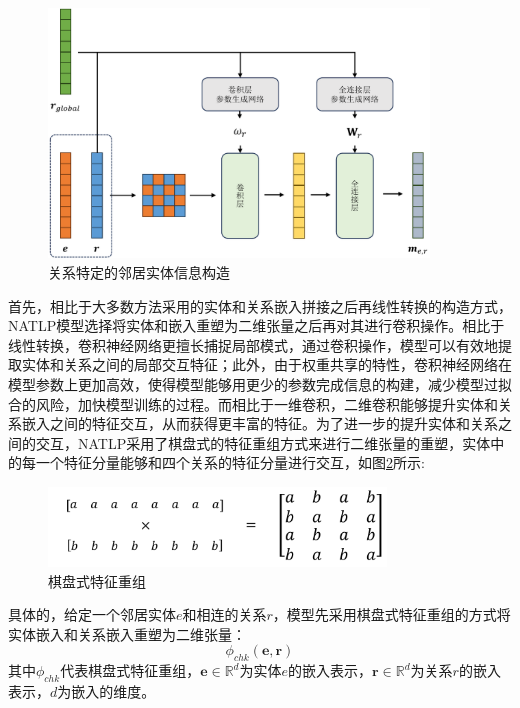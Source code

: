 \begin{figure}[htb]
  \centerline{\includegraphics[width=0.9\textwidth]{pic/build_information.pdf}}
  \caption{关系特定的邻居实体信息构造}
  \label{build_information}
\end{figure}

首先，相比于大多数方法采用的实体和关系嵌入拼接之后再线性转换的构造方式，NATLP模型选择将实体和嵌入重塑为二维张量之后再对其进行卷积操作。相比于线性转换，卷积神经网络更擅长捕捉局部模式，通过卷积操作，模型可以有效地提取实体和关系之间的局部交互特征；此外，由于权重共享的特性，卷积神经网络在模型参数上更加高效，使得模型能够用更少的参数完成信息的构建，减少模型过拟合的风险，加快模型训练的过程。而相比于一维卷积，二维卷积能够提升实体和关系嵌入之间的特征交互，从而获得更丰富的特征。为了进一步的提升实体和关系之间的交互，NATLP采用了棋盘式的特征重组方式来进行二维张量的重塑，实体中的每一个特征分量能够和四个关系的特征分量进行交互，如图\ref{cross_conv}所示:

\begin{figure}[htb]
  \centerline{\includegraphics[width=0.8\textwidth]{pic/cross_conv.pdf}}
  \caption{棋盘式特征重组}
  \label{cross_conv}
\end{figure}

具体的，给定一个邻居实体$e$和相连的关系$r$，模型先采用棋盘式特征重组的方式将实体嵌入和关系嵌入重塑为二维张量：
\begin{equation}
  \phi_{chk}\left(\boldsymbol{e},\boldsymbol{r}\right) 
\end{equation}
其中$\phi_{chk}$代表棋盘式特征重组，$\boldsymbol{e} \in \mathbb{R} ^d$为实体$e$的嵌入表示，$\boldsymbol{r} \in \mathbb{R}^d$为关系$r$的嵌入表示，$d$为嵌入的维度。

